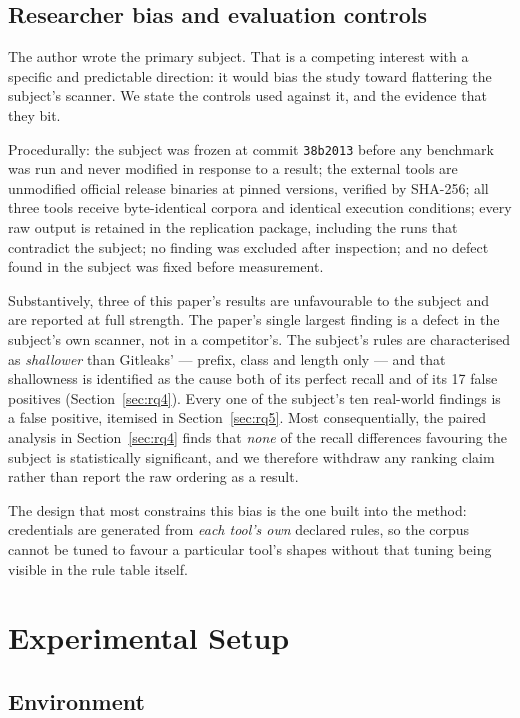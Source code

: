\documentclass[journal]{IEEEtran}
\begin{document}
\subsection{Researcher bias and evaluation controls}
\label{sec:bias}

The author wrote the primary subject. That is a competing interest with a specific and predictable direction: it would bias the study toward flattering the subject's scanner. We state the controls used against it, and the evidence that they bit.

Procedurally: the subject was frozen at commit \texttt{38b2013} before any benchmark was run and never modified in response to a result; the external tools are unmodified official release binaries at pinned versions, verified by SHA-256; all three tools receive byte-identical corpora and identical execution conditions; every raw output is retained in the replication package, including the runs that contradict the subject; no finding was excluded after inspection; and no defect found in the subject was fixed before measurement.

Substantively, three of this paper's results are unfavourable to the subject and are reported at full strength. The paper's single largest finding is a defect in the subject's own scanner, not in a competitor's. The subject's rules are characterised as \emph{shallower} than Gitleaks' --- prefix, class and length only --- and that shallowness is identified as the cause both of its perfect recall and of its 17 false positives (Section~\ref{sec:rq4}). Every one of the subject's ten real-world findings is a false positive, itemised in Section~\ref{sec:rq5}. Most consequentially, the paired analysis in Section~\ref{sec:rq4} finds that \emph{none} of the recall differences favouring the subject is statistically significant, and we therefore withdraw any ranking claim rather than report the raw ordering as a result.

The design that most constrains this bias is the one built into the method: credentials are generated from \emph{each tool's own} declared rules, so the corpus cannot be tuned to favour a particular tool's shapes without that tuning being visible in the rule table itself.

\section{Experimental Setup}
\label{sec:setup}

\subsection{Environment}
\end{document}
